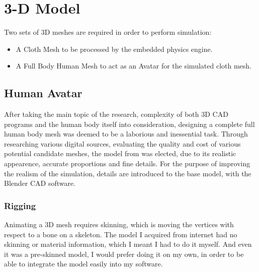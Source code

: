 \chapter{3-D Model}
\label{chapter1}

Two sets of 3D meshes are required in order to perform simulation: 
\begin{itemize}
\item A Cloth Mesh to be processed by the embedded physics engine.
\item A Full Body Human Mesh to act as an Avatar for the simulated cloth mesh.
\end{itemize}

\section{Human Avatar}
\label{section4_1}

\begin{comment}
Although I have experience with modeling in Blender, designing a 3-D human avatar from scratch seemed unnecessary, 
as it is not in my area of expertise and there are available models online. 
After a vast search, I decided to utilize the model I have acquired from a forum, 
as it was realistic in appearance, proportions and details \cite{Mmava2012}. 
In order to make it look more realistic, I needed to implement additional features.
\end{comment}
After taking the main topic of the research, complexity of both 3D CAD programs and the human body itself into consideration, designing a complete full human body mesh was deemed to be a laborious and inessential task. Through researching various digital sources, evaluating the quality and cost of various potential candidate meshes, the model from \cite{Mmava2012} was elected, due to its realistic appearence, accurate proportions and fine details. For the purpose of improving the realism of the simulation, details are introduced to the base model, with the Blender CAD software.  

\subsection{Rigging}

Animating a 3D mesh requires skinning, which is moving the vertices with respect to a bone on a skeleton. The model I acquired from internet had no skinning or material information, which I meant I had to do it myself. And even it was a pre-skinned model, I would prefer doing it on my own, in order to be able to integrate the model easily into my software. 

